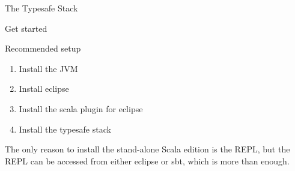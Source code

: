 \begin{frame}{The Typesafe Stack}
\begin{center}
\end{center}
\begin{center}
Get started 
\end{center}
\end{frame}

\begin{frame}{Recommended setup}
\begin{enumerate}
  \item Install the JVM
  \item Install eclipse
  \item Install the scala plugin for eclipse
  \item Install the typesafe stack
\end{enumerate}
The only reason to install the stand-alone Scala edition is the REPL, but the
REPL can be accessed from either eclipse or sbt, which is more than enough.
\end{frame}